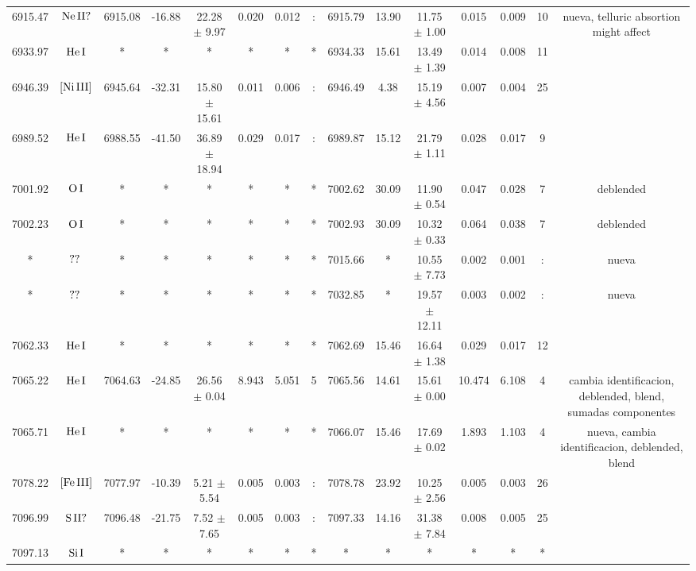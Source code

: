 \documentclass{article}
\begin{document}
\begin{table*}
\begin{adjustbox}{width=\textwidth}
\begin{tabular}{ccccccccccccccc}
6915.47 & $\mbox{Ne}\thinspace \mbox{II?}$ & 6915.08 & -16.88 & 22.28 $\pm$ 9.97 & 0.020 & 0.012 & : & 6915.79 & 13.90 & 11.75 $\pm$ 1.00 & 0.015 & 0.009 & 10 &  nueva, telluric absortion might affect \\
6933.97 & $\mbox{He}\thinspace \mbox{I}$ & * & * & * & * & * & * & 6934.33 & 15.61 & 13.49 $\pm$ 1.39 & 0.014 & 0.008 & 11 &  \\
6946.39 & $\mbox{[Ni}\thinspace \mbox{III]}$ & 6945.64 & -32.31 & 15.80 $\pm$ 15.61 & 0.011 & 0.006 & : & 6946.49 & 4.38 & 15.19 $\pm$ 4.56 & 0.007 & 0.004 & 25 &  \\
6989.52 & $\mbox{He}\thinspace \mbox{I}$ & 6988.55 & -41.50 & 36.89 $\pm$ 18.94 & 0.029 & 0.017 & : & 6989.87 & 15.12 & 21.79 $\pm$ 1.11 & 0.028 & 0.017 & 9 &  \\
7001.92 & $\mbox{O}\thinspace \mbox{I}$ & * & * & * & * & * & * & 7002.62 & 30.09 & 11.90 $\pm$ 0.54 & 0.047 & 0.028 & 7 &  deblended \\
7002.23 & $\mbox{O}\thinspace \mbox{I}$ & * & * & * & * & * & * & 7002.93 & 30.09 & 10.32 $\pm$ 0.33 & 0.064 & 0.038 & 7 &  deblended \\
* & $\mbox{??}\thinspace \mbox{}$ & * & * & * & * & * & * & 7015.66 & * & 10.55 $\pm$ 7.73 & 0.002 & 0.001 & : &  nueva \\
* & $\mbox{??}\thinspace \mbox{}$ & * & * & * & * & * & * & 7032.85 & * & 19.57 $\pm$ 12.11 & 0.003 & 0.002 & : &  nueva \\
7062.33 & $\mbox{He}\thinspace \mbox{I}$ & * & * & * & * & * & * & 7062.69 & 15.46 & 16.64 $\pm$ 1.38 & 0.029 & 0.017 & 12 &  \\
7065.22 & $\mbox{He}\thinspace \mbox{I}$ & 7064.63 & -24.85 & 26.56 $\pm$ 0.04 & 8.943 & 5.051 & 5 & 7065.56 & 14.61 & 15.61 $\pm$ 0.00 & 10.474 & 6.108 & 4 &  cambia identificacion, deblended, blend, sumadas componentes \\
7065.71 & $\mbox{He}\thinspace \mbox{I}$ & * & * & * & * & * & * & 7066.07 & 15.46 & 17.69 $\pm$ 0.02 & 1.893 & 1.103 & 4 &  nueva, cambia identificacion, deblended, blend \\
7078.22 & $\mbox{[Fe}\thinspace \mbox{III]}$ & 7077.97 & -10.39 & 5.21 $\pm$ 5.54 & 0.005 & 0.003 & : & 7078.78 & 23.92 & 10.25 $\pm$ 2.56 & 0.005 & 0.003 & 26 &  \\
7096.99 & $\mbox{S}\thinspace \mbox{II?}$ & 7096.48 & -21.75 & 7.52 $\pm$ 7.65 & 0.005 & 0.003 & : & 7097.33 & 14.16 & 31.38 $\pm$ 7.84 & 0.008 & 0.005 & 25 &  \\
7097.13 & $\mbox{Si}\thinspace \mbox{I}$ & * & * & * & * & * & * & * & * & * & * & * & * &  \\

\end{tabular}
\end{adjustbox}
\end{table*}
\end{document}
